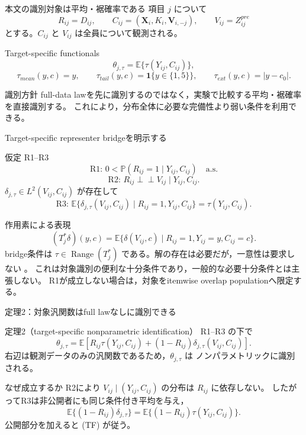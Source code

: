 \documentclass[aspectratio=169,10pt]{beamer}
\newcommand{\E}{\mathbb{E}}
\newcommand{\Prb}{\mathbb{P}}
\newcommand{\1}{\mathbf{1}}
\newcommand{\indep}{\mathrel{\perp\!\!\!\perp}}
\newcommand{\V}{\bm{V}}
\newcommand{\X}{\bm{X}}
\newcommand{\Range}{\operatorname{Range}}
\begin{document}
\begin{frame}{本文の識別対象は平均・裾確率である}
項目 $j$ について
\[
R_{ij}=D_{ij},\qquad
C_{ij}=(\X_i,K_i,\V_{i,-j}),\qquad
V_{ij}=Z^{pre}_{ij}
\]
とする。$C_{ij}$ と $V_{ij}$ は全員について観測される。
\begin{block}{Target-specific functionals}
\scriptsize
\[
\theta_{j,\tau}=\E\{\tau(Y_{ij},C_{ij})\},
\]
\[
\tau_{mean}(y,c)=y,\qquad
\tau_{tail}(y,c)=\1\{y\in\{1,5\}\},\qquad
\tau_{ext}(y,c)=|y-c_0|.
\]
\end{block}
\begin{alertblock}{識別方針}
full-data lawを先に識別するのではなく，実験で比較する平均・裾確率を直接識別する。
これにより，分布全体に必要な完備性より弱い条件を利用できる。
\end{alertblock}
\end{frame}

\begin{frame}{Target-specific representer bridgeを明示する}
\begin{block}{仮定 R1--R3}
\scriptsize
\[
\text{R1: }0<\Prb(R_{ij}=1\mid Y_{ij},C_{ij})\quad\text{a.s.}
\]
\[
\text{R2: }R_{ij}\indep V_{ij}\mid Y_{ij},C_{ij}.
\tag{SV}
\]
$\delta_{j,\tau}\in L^2(V_{ij},C_{ij})$ が存在して
\[
\text{R3: }\E\{\delta_{j,\tau}(V_{ij},C_{ij})
\mid R_{ij}=1,Y_{ij},C_{ij}\}
=\tau(Y_{ij},C_{ij}).
\tag{Bridge}
\]
\end{block}
\begin{alertblock}{作用素による表現}
\scriptsize
\[
(T_j^*\delta)(y,c)
=\E\{\delta(V_{ij},c)\mid R_{ij}=1,Y_{ij}=y,C_{ij}=c\}.
\]
bridge条件は $\tau\in\Range(T_j^*)$ である。解の存在は必要だが，一意性は要求しない
\parencite{LiMiaoTchetgen2023}。
これは対象識別の便利な十分条件であり，一般的な必要十分条件とは主張しない。
R1が成立しない場合は，対象をitemwise overlap populationへ限定する。
\end{alertblock}
\end{frame}

\begin{frame}{定理2：対象汎関数はfull lawなしに識別できる}
\begin{alertblock}{定理2（target-specific nonparametric identification）}
R1--R3 の下で
\[
\boxed{
\theta_{j,\tau}
=\E\left[
R_{ij}\tau(Y_{ij},C_{ij})
+(1-R_{ij})\delta_{j,\tau}(V_{ij},C_{ij})
\right].}
\tag{TF}
\]
右辺は観測データのみの汎関数であるため，$\theta_{j,\tau}$ は
ノンパラメトリックに識別される。
\end{alertblock}
\begin{block}{なぜ成立するか}
\scriptsize
R2により $V_{ij}\mid(Y_{ij},C_{ij})$ の分布は $R_{ij}$ に依存しない。
したがってR3は非公開者にも同じ条件付き平均を与え，
\[
\E\{(1-R_{ij})\delta_{j,\tau}\}
=\E\{(1-R_{ij})\tau(Y_{ij},C_{ij})\}.
\]
公開部分を加えると (TF) が従う。
\end{block}
\end{frame}
\end{document}
